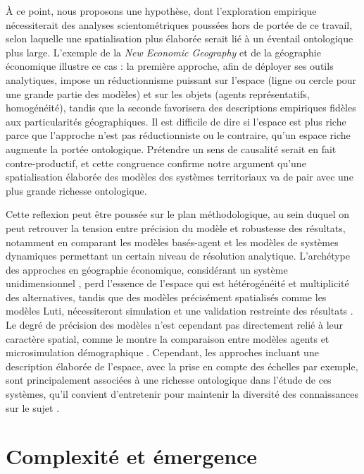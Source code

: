 \documentclass[11pt]{article}
\begin{document}
À ce point, nous proposons une hypothèse, dont l'exploration empirique nécessiterait des analyses scientométriques poussées hors de portée de ce travail, selon laquelle une spatialisation plus élaborée serait lié à un éventail ontologique plus large. L'exemple de la \emph{New Economic Geography} et de la géographie économique illustre ce cas \cite{marchionni2004geographical}: la première approche, afin de déployer ses outils analytiques, impose un réductionnisme puissant sur l'espace (ligne ou cercle pour une grande partie des modèles) et sur les objets (agents représentatifs, homogénéité), tandis que la seconde favorisera des descriptions empiriques fidèles aux particularités géographiques. Il est difficile de dire si l'espace est plus riche parce que l'approche n'est pas réductionniste ou le contraire, qu'un espace riche augmente la portée ontologique. Prétendre un sens de causalité serait en fait contre-productif, et cette congruence confirme notre argument qu'une spatialisation élaborée des modèles des systèmes territoriaux va de pair avec une plus grande richesse ontologique.

Cette reflexion peut être poussée sur le plan méthodologique, au sein duquel on peut retrouver la tension entre précision du modèle et robustesse des résultats, notamment en comparant les modèles basés-agent et les modèles de systèmes dynamiques permettant un certain niveau de résolution analytique. L'archétype des approches en géographie économique, considérant un système unidimensionnel \citep{krugman1992dynamic}, perd l'essence de l'espace qui est hétérogénéité et multiplicité des alternatives, tandis que des modèles précisément spatialisés comme les modèles Luti, nécessiteront simulation et une validation restreinte des résultats \citep{bonnel2014survey}. Le degré de précision des modèles n'est cependant pas directement relié à leur caractère spatial, comme le montre la comparaison entre modèles agents et microsimulation démographique \citep{birkin2011spatial}. Cependant, les approches incluant une description élaborée de l'espace, avec la prise en compte des échelles par exemple, sont principalement associées à une richesse ontologique dans l'étude de ces systèmes, qu'il convient d'entretenir pour maintenir la diversité des connaissances sur le sujet \citep{sanders2018survival}.


\section{Complexité et émergence}
\end{document}
